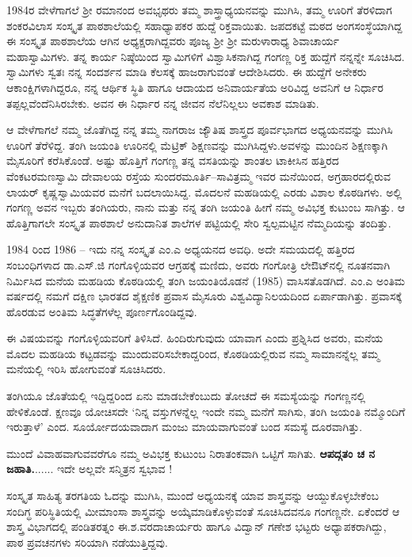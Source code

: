 1984ರ ವೇಳೆಗಾಗಲೆ ಶ್ರೀ ರಮಾನಂದ ಅವಭೃಥರು ತಮ್ಮ ಶಾಸ್ತ್ರಾಧ್ಯಯನವನ್ನು ಮುಗಿಸಿ, ತಮ್ಮ ಊರಿಗೆ ತೆರಳಿದಾಗ ಶಂಕರವಿಲಾಸ ಸಂಸ್ಕೃತ ಪಾಠಶಾಲೆಯಲ್ಲಿ ಸಹಾಧ್ಯಾಪಕರ ಹುದ್ದೆ ರಿಕ್ತವಾಯಿತು. ಜಪದಕಟ್ಟೆ ಮಠದ ಅಂಗಸಂಸ್ಥೆಯಾಗಿದ್ದ ಈ ಸಂಸ್ಕೃತ ಪಾಠಶಾಲೆಯ ಆಗಿನ ಅಧ್ಯಕ್ಷರಾಗಿದ್ದವರು ಪೂಜ್ಯ ಶ್ರೀ ಶ್ರೀ ಮರುಳಾರಾಧ್ಯ ಶಿವಾಚಾರ್ಯ ಮಹಾಸ್ವಾಮಿಗಳು. ತನ್ನ ಕಾರ್ಯ ನಿಷ್ಠೆಯಿಂದ ಸ್ವಾಮಿಗಳಿಗೆ ವಿಶ್ವಾಸಿಕನಾಗಿದ್ದ ಗಂಗಣ್ಣ ರಿಕ್ತ ಹುದ್ದೆಗೆ ನನ್ನನ್ನೇ ಸೂಚಿಸಿದ. ಸ್ವಾಮಿಗಳು ಸ್ವತಃ ನನ್ನ ಸಂದರ್ಶನ ಮಾಡಿ ಕೆಲಸಕ್ಕೆ ಹಾಜರಾಗುವಂತೆ ಆದೇಶಿಸಿದರು. ಈ ಹುದ್ದೆಗೆ ಅನೇಕರು ಆಕಾಂಕ್ಷಿಗಳಾಗಿದ್ದರೂ, ನನ್ನ ಆರ್ಥಿಕ ಸ್ಥಿತಿ ಹಾಗೂ ಆದಾಯದ ಅನಿವಾರ್ಯತೆಯ ಅರಿವಿದ್ದ ಅವನಿಗೆ ಆ ನಿರ್ಧಾರ ತಪ್ಪಲ್ಲವೆಂದೆನಿಸಿರಬೇಕು. ಅವನ ಈ ನಿರ್ಧಾರ ನನ್ನ ಜೀವನ ನೆಲೆನಿಲ್ಲಲು ಅವಕಾಶ ಮಾಡಿತು.

ಆ ವೇಳೆಗಾಗಲೆ ನಮ್ಮ ಜೊತೆಗಿದ್ದ ನನ್ನ ತಮ್ಮ ನಾಗರಾಜ ಜ್ಯೌತಿಷ ಶಾಸ್ತ್ರದ ಪೂರ್ವಭಾಗದ ಅಧ್ಯಯನವನ್ನು ಮುಗಿಸಿ ಊರಿಗೆ ತೆರೆಳಿದ್ದ. ತಂಗಿ ಜಯಂತಿ ಊರಿನಲ್ಲಿ ಮೆಟ್ರಿಕ್ ಶಿಕ್ಷಣವನ್ನು ಮುಗಿಸಿದ್ದಳು.ಅವಳನ್ನು ಮುಂದಿನ ಶಿಕ್ಷಣಕ್ಕಾಗಿ ಮೈಸೂರಿಗೆ ಕರೆಸಿಕೊಂಡೆ. ಅಷ್ಟು ಹೊತ್ತಿಗೆ ಗಂಗಣ್ಣ ತನ್ನ ವಸತಿಯನ್ನು ಶಾಂತಲ ಟಾಕೀಸಿನ ಹತ್ತಿರದ ವೆಂಕಟರಮಣಸ್ವಾಮಿ ದೇವಾಲಯ ರಸ್ತೆಯ ಸುಂದರಮೂರ್ತಿ–ಸಾವಿತ್ರಮ್ಮ ಇವರ ಮನೆಯಿಂದ, ಅಗ್ರಹಾರದಲ್ಲಿರುವ ಲಾಯರ್ ಕೃಷ್ಣಸ್ವಾಮಿಯವರ ಮನೆಗೆ ಬದಲಾಯಿಸಿದ್ದ. ಮೊದಲನೆ ಮಹಡಿಯಲ್ಲಿ ಎರಡು ವಿಶಾಲ ಕೊಠಡಿಗಳು. ಅಲ್ಲಿ ಗಂಗಣ್ಣ ಅವನ ಇಬ್ಬರು ತಂಗಿಯರು, ನಾನು ಮತ್ತು ನನ್ನ ತಂಗಿ ಜಯಂತಿ ಹೀಗೆ ನಮ್ಮ ಅವಿಭಕ್ತ ಕುಟುಂಬ ಸಾಗಿತ್ತು. ಆ ಹೊತ್ತಿಗಾಗಲೇ ಸಂಸ್ಕೃತ ಪಾಠಶಾಲೆ ಅನುದಾನಿತ ಶಾಲೆಗಳ ಪಟ್ಟಿಯಲ್ಲಿ ಸೇರಿ ಸ್ವಲ್ಪಮಟ್ಟಿನ ನೆಮ್ಮದಿಯನ್ನು ತಂದಿತ್ತು.

1984 ರಿಂದ 1986 – ಇದು ನನ್ನ ಸಂಸ್ಕೃತ ಎಂ.ಎ ಅಧ್ಯಯನದ ಅವಧಿ. ಅದೇ ಸಮಯದಲ್ಲಿ ಹತ್ತಿರದ ಸಂಬಂಧಿಗಳಾದ ಡಾ.ಎಸ್.ಜಿ ಗಂಗೊಳ್ಳಿಯವರ ಆಗ್ರಹಕ್ಕೆ ಮಣಿದು, ಅವರು ಗಂಗೋತ್ರಿ ಲೇಔಟ್‍ನಲ್ಲಿ ನೂತನವಾಗಿ ನಿರ್ಮಿಸಿದ ಮನೆಯ ಮಹಡಿಯ ಕೊಠಡಿಯಲ್ಲಿ ತಂಗಿ ಜಯಂತಿಯೊಡನೆ (1985) ವಾಸಿಸತೊಡಗಿದೆ. ಎಂ.ಎ ಅಂತಿಮ ವರ್ಷದಲ್ಲಿ ನಮಗೆ ದಕ್ಷಿಣ  ಭಾರತದ ಶೈಕ್ಷಣಿಕ ಪ್ರವಾಸ ಮೈಸೂರು ವಿಶ್ವವಿದ್ಯಾನಿಲಯದಿಂದ ಏರ್ಪಾಡಾಗಿತ್ತು. ಪ್ರವಾಸಕ್ಕೆ ಹೊರಡುವ ಅಂತಿಮ ಸಿದ್ಧತೆಗಳೆಲ್ಲ ಪೂರ್ಣಗೊಂಡಿದ್ದವು.

ಈ ವಿಷಯವನ್ನು ಗಂಗೊಳ್ಳಿಯವರಿಗೆ ತಿಳಿಸಿದೆ.  ಹಿಂದಿರುಗುವುದು ಯಾವಾಗ ಎಂದು ಪ್ರಶ್ನಿಸಿದ ಅವರು, ಮನೆಯ ಮೊದಲ ಮಹಡಿಯ ಕಟ್ಟಡವನ್ನು ಮುಂದುವರಿಸಬೇಕಾದ್ದರಿಂದ, ಕೊಠಡಿಯಲ್ಲಿರುವ ನಮ್ಮ ಸಾಮಾನನ್ನೆಲ್ಲ ತಮ್ಮ ಮನೆಯಲ್ಲಿ ಇರಿಸಿ ಹೋಗುವಂತೆ ಸೂಚಿಸಿದರು. 

ತಂಗಿಯೂ ಜೊತೆಯಲ್ಲಿ ಇದ್ದಿದ್ದರಿಂದ ಏನು ಮಾಡಬೇಕೆಂಬುದು ತೋಚದೆ ಈ ಸಮಸ್ಯೆಯನ್ನು ಗಂಗಣ್ಣನಲ್ಲಿ ಹೇಳಿಕೊಂಡೆ. ಕ್ಷಣವೂ ಯೋಚಿಸದೇ ‘ನಿನ್ನ ವಸ್ತುಗಳನ್ನೆಲ್ಲ ಇಂದೇ ನಮ್ಮ ಮನೆಗೆ ಸಾಗಿಸು, ತಂಗಿ ಜಯಂತಿ ನಮ್ಮೊಂದಿಗೆ ಇರುತ್ತಾಳೆ’ ಎಂದ. ಸೂರ್ಯೋದಯವಾದಾಗ ಮಂಜು ಮಾಯವಾಗುವಂತೆ ಬಂದ ಸಮಸ್ಯೆ ದೂರವಾಗಿತ್ತು. 

ಮುಂದೆ ವಿವಾಹವಾಗುವವರೆಗೂ ನಮ್ಮ ಅವಿಭಕ್ತ ಕುಟುಂಬ ನಿರಾತಂಕವಾಗಿ ಒಟ್ಟಿಗೆ ಸಾಗಿತು. \textbf{ಆಪದ್ಗತಂ ಚ ನ ಜಹಾತಿ.}...... ಇದೇ ಅಲ್ಲವೇ ಸನ್ಮಿತ್ರನ ಸ್ವಭಾವ ! 

ಸಂಸ್ಕೃತ ಸಾಹಿತ್ಯ ತರಗತಿಯ ಓದನ್ನು ಮುಗಿಸಿ, ಮುಂದೆ ಅಧ್ಯಯನಕ್ಕೆ ಯಾವ ಶಾಸ್ತ್ರವನ್ನು ಆಯ್ದುಕೊಳ್ಳಬೇಕೆಂಬ ಸಂದಿಗ್ಧ ಪರಿಸ್ಥಿತಿಯಲ್ಲಿ  ಮೀಮಾಂಸಾ ಶಾಸ್ತ್ರವನ್ನು  ಅಯ್ಕೆಮಾಡಿಕೊಳ್ಳುವಂತೆ ಸೂಚಿಸಿದವನೂ ಗಂಗಣ್ಣನೇ. ಏಕೆಂದರೆ ಆ ಶಾಸ್ತ್ರ ವಿಭಾಗದಲ್ಲಿ ಪಂಡಿತರತ್ನಂ ಈ.ಶ.ವರದಾಚಾರ್ಯರು ಹಾಗೂ ವಿದ್ವಾನ್ ಗಣೇಶ ಭಟ್ಟರು ಅಧ್ಯಾಪಕರಾಗಿದ್ದು, ಪಾಠ ಪ್ರವಚನಗಳು ಸರಿಯಾಗಿ ನಡೆಯುತ್ತಿದ್ದವು.


